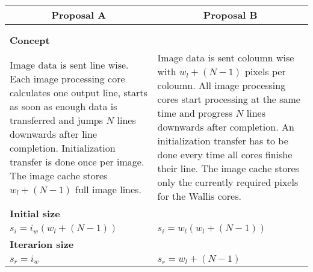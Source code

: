 \begin{table}[b!]
    \centering
    \begin{tabular}{p{} p{}}
        \toprule
        \multicolumn{1}{c}{Proposal A} & \multicolumn{1}{c}{Proposal B} \\
        \midrule
        \multicolumn{1}{c}{
            \begin{adjustbox}{scale=0.7}
                
            \end{adjustbox}}
        & 
        \multicolumn{1}{c}{
            \begin{adjustbox}{scale=0.7}
                
            \end{adjustbox}}
        \\
        \multicolumn{2}{c}{
            \begin{adjustbox}{max width=0.6\textwidth}
                
            \end{adjustbox}
        }
        \\\midrule
        \textbf{Concept} & \\
        Image data is sent line wise. Each image processing core calculates one
        output line, starts as soon as enough data is transferred and jumps $N$ lines
        downwards after line completion. Initialization transfer is done once
        per image. The image cache stores $w_l+(N-1)$ full image lines.
        &
        Image data is sent coloumn wise with $w_l+(N-1)$ pixels per coloumn. All
        image processing cores start processing at the same time and progress
        $N$ lines downwards after completion. An initialization transfer has to be done
        every time all cores finishe their line. The image cache stores only the currently required
        pixels for the Wallis cores.
        \\\midrule
        \textbf{Initial size} & \\
        {\( 
            s_i = i_w(w_l+(N-1))
        \)}
        &
        {\( 
            s_i = w_l(w_l+(N-1))
        \)}
        \\\midrule
        \textbf{Iterarion size} & \\
        {\( 
            s_r  = i_w
        \)}
        &
        {\( 
            s_r  = w_l+(N-1)
        \)}
        \\\midrule

\end{tabular}
\end{table}
